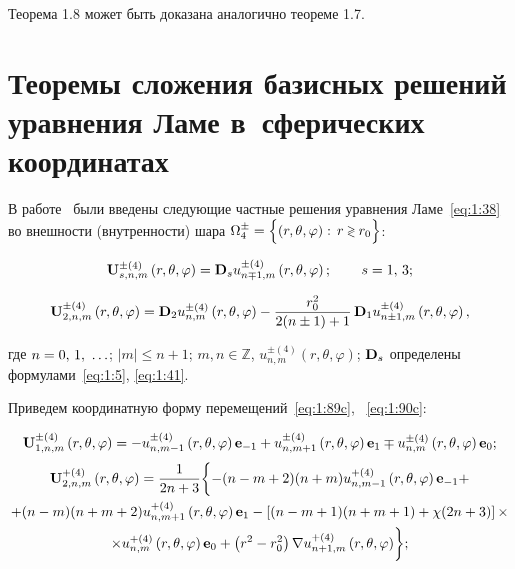 Теорема 1.8 может быть доказана аналогично теореме 1.7.

\section{Теоремы сложения базисных решений уравнения Ламе в~сферических координатах}

В работе~\cite{Nikolaev1984} были введены следующие частные решения уравнения Ламе~\eqref{eq:1:38} во внешности (внутренности) шара $\Omega _4^ \pm  = \Big\{ {\left( {r,\theta ,\varphi } \right):{\mkern 1mu} {\kern 1pt} r \mathbin{\lower.3ex\hbox{$\buildrel>\over
{\smash{\scriptstyle<}\vphantom{_x}}$}} {r_0}} \Big\}$:

\begin{equation}\label{eq:1:89c}
{\bf{U}}_{s,n,m}^{ \pm (4)}\left( {r,\theta ,\varphi } \right) = {{\bf{D}}_s}u_{n \mp 1,m}^{ \pm (4)}\left( {r,\theta ,\varphi } \right);\qquad {\kern 1pt} s = 1,{\mkern 1mu} {\kern 1pt} 3;
\end{equation}

\begin{equation}\label{eq:1:90c}
{\bf{U}}_{2,n,m}^{ \pm (4)}\left( {r,\theta ,\varphi } \right) = {{\bf{D}}_2}u_{n,m}^{ \pm (4)}\left( {r,\theta ,\varphi } \right) - \frac{{r_0^2}}{{2(n \pm 1) + 1}}\,{{\bf{D}}_1}u_{n \pm 1,m}^{ \pm (4)}\left( {r,\theta ,\varphi } \right),
\end{equation}

\noindent где $n = 0,{\mkern 1mu} {\kern 1pt} 1,{\mkern 1mu} {\kern 1pt}  \ldots $; $|m| \le n + 1$; $m,n\in\mathbb{Z}$, $u_{n,m}^{ \pm (4)}\left( {r,\theta ,\varphi } \right)$; ${{\bf{D}}_s}$ определены формулами~\eqref{eq:1:5}, \eqref{eq:1:41}.

Приведем координатную форму перемещений~\eqref{eq:1:89c}, ~\eqref{eq:1:90c}:

\begin{equation}\label{eq:1:91}
{\bf{U}}_{1,n,m}^{ \pm (4)}\left( {r,\theta ,\varphi } \right) =  - u_{n,m - 1}^{ \pm (4)}\left( {r,\theta ,\varphi } \right){{\bf{e}}_{ - 1}} + u_{n,m + 1}^{ \pm (4)}\left( {r,\theta ,\varphi } \right){{\bf{e}}_1} \mp u_{n,m}^{ \pm (4)}\left( {r,\theta ,\varphi } \right){{\bf{e}}_0};
\end{equation}
\begin{multline}\label{eq:1:92}
{\bf{U}}_{2,n,m}^{ + (4)}\left( {r,\theta ,\varphi } \right) = \frac{1}{{2n + 3}}\bigg\{ { - (n - m + 2)(n + m)u_{n,m - 1}^{ + (4)}\left( {r,\theta ,\varphi } \right){{\bf{e}}_{ - 1}} + } \\
+ (n - m)(n + m + 2)u_{n,m + 1}^{ + (4)}\left( {r,\theta ,\varphi } \right){{\bf{e}}_1} - \left[ {(n - m + 1)(n + m + 1) + \chi (2n + 3)} \right] \times \\
{ \times u_{n,m}^{ + (4)}\left( {r,\theta ,\varphi } \right){{\bf{e}}_0} + \left( {{r^2} - r_0^2} \right)\nabla u_{n + 1,m}^{ + (4)}\left( {r,\theta ,\varphi } \right)} \bigg\};
\end{multline}

